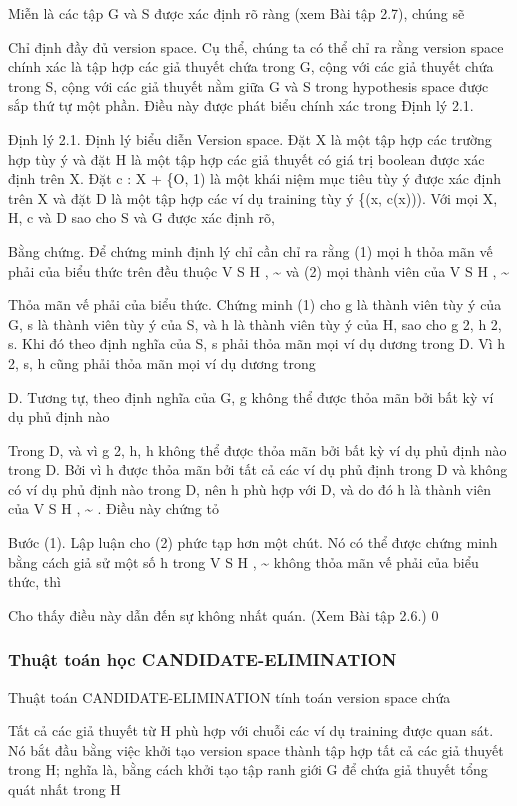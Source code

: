 Miễn là các tập G và S được xác định rõ ràng (xem Bài tập 2.7), chúng sẽ

Chỉ định đầy đủ version space. Cụ thể, chúng ta có thể chỉ ra rằng version space chính xác là tập hợp các giả thuyết chứa trong G, cộng với các giả thuyết chứa trong S, cộng với các giả thuyết nằm giữa G và S trong hypothesis space được sắp thứ tự một phần. Điều này được phát biểu chính xác trong Định lý 2.1.

Định lý 2.1. Định lý biểu diễn Version space. Đặt X là một tập hợp các trường hợp tùy ý và đặt H là một tập hợp các giả thuyết có giá trị boolean được xác định trên X. Đặt c : X + \{O, 1) là một khái niệm mục tiêu tùy ý được xác định trên X và đặt D là một tập hợp các ví dụ training tùy ý \{(x, c(x))). Với mọi X, H, c và D sao cho S và G được xác định rõ,

Bằng chứng. Để chứng minh định lý chỉ cần chỉ ra rằng (1) mọi h thỏa mãn vế phải của biểu thức trên đều thuộc V S H , \textasciitilde{} và (2) mọi thành viên của V S H , \textasciitilde{}

Thỏa mãn vế phải của biểu thức. Chứng minh (1) cho g là thành viên tùy ý của G, s là thành viên tùy ý của S, và h là thành viên tùy ý của H, sao cho g 2, h 2, s. Khi đó theo định nghĩa của S, s phải thỏa mãn mọi ví dụ dương trong D. Vì h 2, s, h cũng phải thỏa mãn mọi ví dụ dương trong

D. Tương tự, theo định nghĩa của G, g không thể được thỏa mãn bởi bất kỳ ví dụ phủ định nào

Trong D, và vì g 2, h, h không thể được thỏa mãn bởi bất kỳ ví dụ phủ định nào trong D. Bởi vì h được thỏa mãn bởi tất cả các ví dụ phủ định trong D và không có ví dụ phủ định nào trong D, nên h phù hợp với D, và do đó h là thành viên của V S H , \textasciitilde{} . Điều này chứng tỏ

Bước (1). Lập luận cho (2) phức tạp hơn một chút. Nó có thể được chứng minh bằng cách giả sử một số h trong V S H , \textasciitilde{} không thỏa mãn vế phải của biểu thức, thì

Cho thấy điều này dẫn đến sự không nhất quán. (Xem Bài tập 2.6.) 0

\subsubsection{Thuật toán học CANDIDATE-ELIMINATION}

Thuật toán CANDIDATE-ELIMINATION tính toán version space chứa

Tất cả các giả thuyết từ H phù hợp với chuỗi các ví dụ training được quan sát. Nó bắt đầu bằng việc khởi tạo version space thành tập hợp tất cả các giả thuyết trong H; nghĩa là, bằng cách khởi tạo tập ranh giới G để chứa giả thuyết tổng quát nhất trong H

